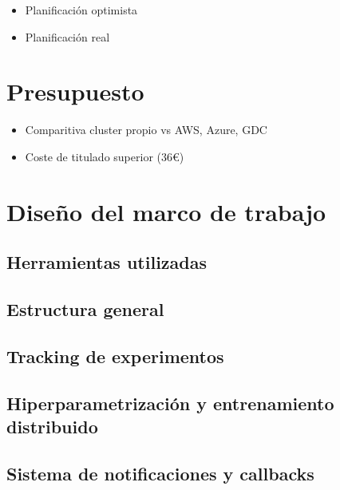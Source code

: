 \documentclass[
  12pt,
  a4paperpaper,
]{report}
\providecommand{\tightlist}{%
  \setlength{\itemsep}{0pt}\setlength{\parskip}{0pt}}
\begin{document}
\begin{itemize}
\tightlist
\item
  Planificación optimista
\item
  Planificación real
\end{itemize}

\hypertarget{presupuesto}{%
\chapter{Presupuesto}\label{presupuesto}}

\begin{itemize}
\tightlist
\item
  Comparitiva cluster propio vs AWS, Azure, GDC
\item
  Coste de titulado superior (36€)
\end{itemize}

\hypertarget{diseuxf1o-del-marco-de-trabajo}{%
\chapter{Diseño del marco de
trabajo}\label{diseuxf1o-del-marco-de-trabajo}}

\hypertarget{herramientas-utilizadas}{%
\section{Herramientas utilizadas}\label{herramientas-utilizadas}}

\hypertarget{estructura-general}{%
\section{Estructura general}\label{estructura-general}}

\hypertarget{tracking-de-experimentos}{%
\section{Tracking de experimentos}\label{tracking-de-experimentos}}

\hypertarget{hiperparametrizaciuxf3n-y-entrenamiento-distribuido}{%
\section{Hiperparametrización y entrenamiento
distribuido}\label{hiperparametrizaciuxf3n-y-entrenamiento-distribuido}}

\hypertarget{sistema-de-notificaciones-y-callbacks}{%
\section{Sistema de notificaciones y
callbacks}\label{sistema-de-notificaciones-y-callbacks}}
\end{document}

